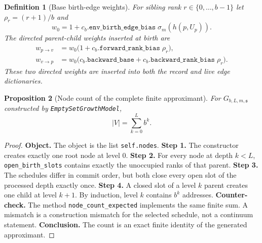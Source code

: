 \documentclass[11pt]{article}
\newtheorem{definition}{Definition}[section]
\newtheorem{proposition}[definition]{Proposition}
\theoremstyle{remark}
\newcommand{\code}[1]{\texttt{#1}}
\numberwithin{equation}{section}
\begin{document}
\begin{definition}[Base birth-edge weights]
For sibling rank $r\in\{0,\ldots,b-1\}$ let $\rho_r=(r+1)/b$ and
\begin{equation}
  w_0 = 1+c_b.\code{env\_birth\_edge\_bias}\;\sigma_m(h(p,U_p)).
  \label{eq:base-birth-edge-weight}
\end{equation}
The directed parent-child weights inserted at birth are
\begin{equation}
\begin{aligned}
  w_{p\to v} &= w_0\bigl(1+c_b.\code{forward\_rank\_bias}\;\rho_r\bigr),\\
  w_{v\to p} &= w_0\bigl(c_b.\code{backward\_base}+c_b.\code{backward\_rank\_bias}\;\rho_r\bigr).
\end{aligned}
\label{eq:directed-birth-edge-weights}
\end{equation}
These two directed weights are inserted into both the record and live edge dictionaries.
\end{definition}

\begin{proposition}[Node count of the complete finite approximant]
For \(G_{b,L,m,\mathfrak{s}}\) constructed by \code{EmptySetGrowthModel},
\begin{equation}
  |V|=\sum_{k=0}^L b^k.
  \label{eq:complete-approximant-node-count}
\end{equation}
\end{proposition}
\begin{proof}
\textbf{Object.} The object is the list \code{self.nodes}. \textbf{Step 1.} The constructor creates exactly one root node at level \(0\). \textbf{Step 2.} For every node at depth \(k<L\), \code{open\_\allowbreak{}birth\_\allowbreak{}slots} contains exactly the unoccupied ranks of that parent. \textbf{Step 3.} The schedules differ in commit order, but both close every open slot of the processed depth exactly once. \textbf{Step 4.} A closed slot of a level \(k\) parent creates one child at level \(k+1\). By induction, level \(k\) contains \(b^k\) addresses. \textbf{Counter-check.} The method \code{node\_\allowbreak{}count\_\allowbreak{}expected} implements the same finite sum. A mismatch is a construction mismatch for the selected schedule, not a continuum statement. \textbf{Conclusion.} The count is an exact finite identity of the generated approximant.
\end{proof}
\end{document}
